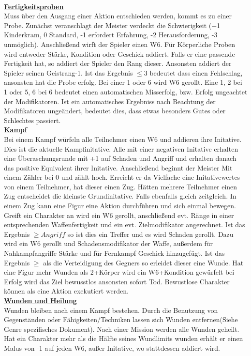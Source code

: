 \documentclass[twoside,a4paper]{minimal}
\begin{document}
\begin{multicols*}{3}
\textbf{\uline{\\Fertigkeitsproben}}
\\Muss über den Ausgang einer Aktion entschieden werden, kommt es zu einer Probe. Zunächst veranschlagt der Meister verdeckt die Schwierigkeit (+1 Kinderkram, 0 Standard, -1 erfordert Erfahrung, -2 Herausforderung, -3 unmöglich). Anschließend wirft der Spieler einen W6. Für Körperliche Proben wird entweder Stärke, Kondition oder Geschick addiert. Falls er eine passende Fertigkeit hat, so addiert der Spieler den Rang dieser. Ansonsten addiert der Spieler seinen Geistrang-1. Ist das Ergebnis $\leq 3$ bedeutet dass einen Fehlschlag, ansonsten hat die Probe erfolg. Bei einer 1 oder 6 wird W6 gerollt. Eine 1, 2 bei 1 oder 5, 6 bei 6 bedeutet einen automatischen Misserfolg, bzw. Erfolg ungeachtet der Modifikatoren. Ist ein automatisches Ergebniss nach Beachtung der Modifikatoren ungeändert, bedeutet dies, dass etwas besonders Gutes oder Schlechtes passiert.
\textbf{\uline{\\Kampf}}
\\Bei einem Kampf würfeln alle Teilnehmer einen W6 und addieren ihre Initative. Dies ist die aktuelle Kampfinitative. Alle mit einer negativen Initative erhalten eine Überaschungsrunde mit +1 auf Schaden und Angriff und erhalten danach das positive Equivalent ihrer Initative. Anschließend beginnt der Meister Mit einem Zähler bei 0 und zählt hoch. Erreicht er da Vielfache eine Initativewertes von einem Teilnehmer, hat dieser einen Zug. Hätten mehrere Teilnehmer einen Zug entscheidet die kleinste Grundinitative. Falls ebenfalls gleich zeitgleich.
In einem Zug kann eine Figur eine Aktion durchführen und sich einmal bewegen. Greift ein Charakter an wird ein W6 gerollt, anschließend evt. Ränge in einer entsprechenden Waffenfertigkeit und ein evt. Zielmodifikator angerechnet. Ist das Ergebnis $\geq Angriff$ so ist dies ein Treffer und es wird Schaden gerollt. Dazu wird ein W6 gerollt und Schadensmodifikator der Waffe, außerdem für Nahkampfangriffe Stärke und für Fernkampf Geschick hinzugefügt. Ist das Ergebnis $\geq$ als die Verteidigung des Gegners so erleidet dieser eine Wunde. Hat eine Figur mehr Wunden als 2+Körper wird ein W6+Kondition gewürfelt bei Erfolg wird das Ziel bewusstlos ansonsten sofort Tod. Bewustlose Charakter können als eine Aktion exekutiert werden.
\textbf{\uline{\\Wunden und Heilung}}
\\Wunden bleiben nach einem Kampf bestehen. Durch die Benutzung von Gegenständen oder Fähigkeiten/Techniken lassen sich Wunden entfernen(Siehe Genre spezifisches Dokument). Nach einer Mission werden alle Wunden geheilt. Hat ein Charakter mehr als die Hälfte seines Wundlimits wunden erhält er einen Malus von -1 auf jeden W6, außer Initative, wo stattdessen addiert wird.

\end{multicols*}
\end{document}
